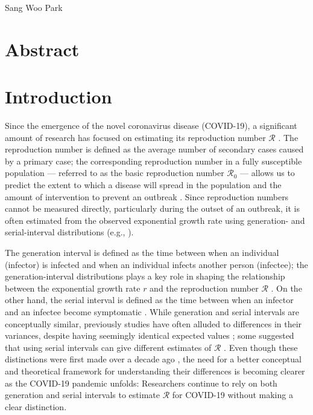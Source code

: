 \documentclass[12pt]{article}
\date{\today}
\begin{document}
\begin{flushleft}{
	\Large
	\textbf{}
}
\newline
Sang Woo Park
\end{flushleft}

\section*{Abstract}

\pagebreak

\section{Introduction}

Since the emergence of the novel coronavirus disease (COVID-19), a significant amount of research has focused on estimating its reproduction number $\mathcal R$ \citep{majumder2020early}.
The reproduction number is defined as the average number of secondary cases caused by a primary case;
the corresponding reproduction number in a fully susceptible population --- referred to as the basic reproduction number $\mathcal R_0$ --- allows us to predict the extent to which a disease will spread in the population and the amount of intervention to prevent an outbreak \citep{anderson1991infectious}.
Since reproduction numbers cannot be measured directly, particularly during the outset of an outbreak, it is often estimated from the observed exponential growth rate using generation- and serial-interval distributions (e.g., \cite{du2020serial, jung2020real, li2020early, zhao2020preliminary}).

The generation interval is defined as the time between when an individual (infector) is infected and when an individual infects another person (infectee);
the generation-interval distributions plays a key role in shaping the relationship between the exponential growth rate $r$ and the reproduction number $\mathcal R$ \citep{wallinga2007generation}.
On the other hand, the serial interval is defined as the time between when an infector and an infectee become symptomatic \citep{svensson2007note}.
While generation and serial intervals are conceptually similar,
previously studies have often alluded to differences in their variances, despite having seemingly identical expected values \citep{svensson2007note,klinkenberg2011correlation,champredon2018equivalence};
some suggested that using serial intervals can give different estimates of $\mathcal R$ \citep{britton2019estimation}.
Even though these distinctions were first made over a decade ago \citep{svensson2007note}, 
the need for a better conceptual and theoretical framework for understanding their differences is becoming clearer as the COVID-19 pandemic unfolds:
Researchers continue to rely on both generation and serial intervals to estimate $\mathcal R$ for COVID-19 without making a clear distinction.
\end{document}
